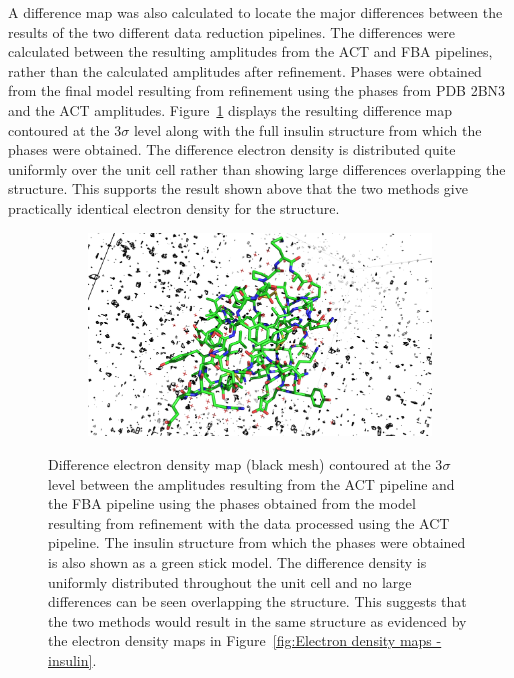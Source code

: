 A difference map was also calculated to locate the major differences between the results of the two different data reduction pipelines.
The differences were calculated between the resulting amplitudes from the ACT and FBA pipelines, rather than the calculated amplitudes after refinement.
Phases were obtained from the final model resulting from refinement using the phases from PDB 2BN3 and the ACT amplitudes.
Figure~\ref{fig:Difference electron density map - insulin} displays the resulting difference map contoured at the 3$\sigma$ level along with the full insulin structure from which the phases were obtained.
The difference electron density is distributed quite uniformly over the unit cell rather than showing large differences overlapping the structure.
This supports the result shown above that the two methods give practically identical electron density for the structure.
\begin{figure}
    \begin{subfigure}[b]{1.0\textwidth}
        \centering
        \includegraphics[width=\textwidth]{figures/datared/diff_aim_fba_insulin_seq_cnvc.png}
    \end{subfigure}
    \caption[Difference electron density map for insulin dataset.]{Difference electron density map (black mesh) contoured at the 3$\sigma$ level between the amplitudes resulting from the ACT pipeline and the FBA pipeline using the phases obtained from the model resulting from refinement with the data processed using the ACT pipeline.
    The insulin structure from which the phases were obtained is also shown as a green stick model.
    The difference density is uniformly distributed throughout the unit cell and no large differences can be seen overlapping the structure.
    This suggests that the two methods would result in the same structure as evidenced by the electron density maps in Figure~\ref{fig:Electron density maps - insulin}.}
    \label{fig:Difference electron density map - insulin}
\end{figure}

